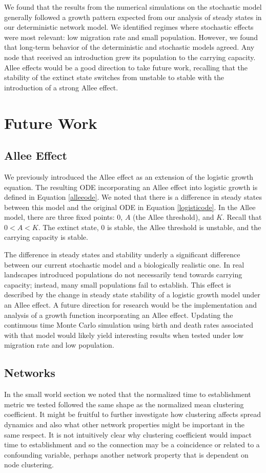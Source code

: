 \documentclass[12pt, openany]{book}
\theoremstyle{definition}
\theoremstyle{remark}
\numberwithin{equation}{chapter}
\numberwithin{figure}{chapter}
\begin{document}
We found that the results from the numerical simulations on the stochastic model generally followed a growth pattern expected from our analysis of steady states in our deterministic network model. We identified regimes where stochastic effects were most relevant: low migration rate and small population. However, we found that long-term behavior of the deterministic and stochastic models agreed. Any node that received an introduction grew its population to the carrying capacity. Allee effects would be a good direction to take future work, recalling that the stability of the extinct state switches from unstable to stable with the introduction of a strong Allee effect.

\section{Future Work}
\subsection{Allee Effect}
We previously introduced the Allee effect as an extension of the logistic growth equation. The resulting ODE incorporating an Allee effect into logistic growth is defined in Equation \ref{alleeode}. We noted that there is a difference in steady states between this model and the original ODE in Equation \ref{logisticode}. In the Allee model, there are three fixed points: $0$, $A$ (the Allee threshold), and $K$. Recall that $0 < A < K$. The extinct state, $0$ is stable, the Allee threshold is unstable, and the carrying capacity is stable. 

The difference in steady states and stability underly a significant difference between our current stochastic model and a biologically realistic one. In real landscapes introduced populations do not necessarily tend towards carrying capacity; instead, many small populations fail to establish. This effect is described by the change in steady state stability of a logistic growth model under an Allee effect. A future direction for research would be the implementation and analysis of a growth function incorporating an Allee effect. Updating the continuous time Monte Carlo simulation using birth and death rates associated with that model would likely yield interesting results when tested under low migration rate and low population. 

\subsection{Networks}
In the small world section we noted that the normalized time to establishment metric we tested followed the same shape as the normalized mean clustering coefficient. It might be fruitful to further investigate how clustering  affects spread dynamics and also what other network properties might be important in the same respect. It is not intuitively clear why clustering coefficient would impact time to establishment and so the connection may be a coincidence or related to a confounding variable, perhaps another network property that is dependent on node clustering.
\end{document}
